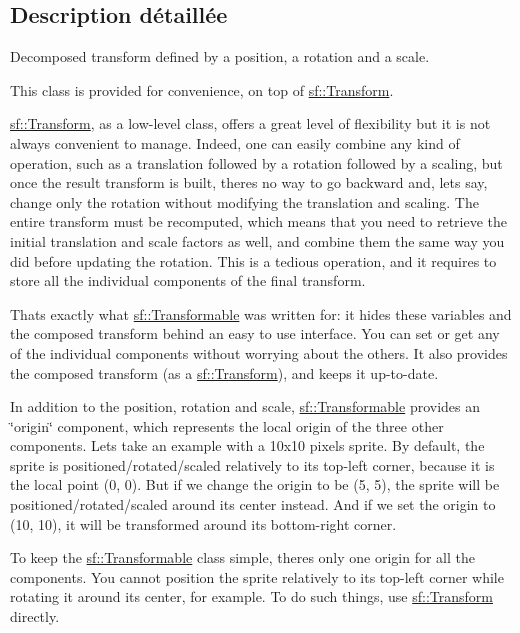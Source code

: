 \subsection{Description détaillée}
Decomposed transform defined by a position, a rotation and a scale. 

This class is provided for convenience, on top of \hyperlink{classsf_1_1Transform}{sf\+::\+Transform}.

\hyperlink{classsf_1_1Transform}{sf\+::\+Transform}, as a low-\/level class, offers a great level of flexibility but it is not always convenient to manage. Indeed, one can easily combine any kind of operation, such as a translation followed by a rotation followed by a scaling, but once the result transform is built, there\textquotesingle{}s no way to go backward and, let\textquotesingle{}s say, change only the rotation without modifying the translation and scaling. The entire transform must be recomputed, which means that you need to retrieve the initial translation and scale factors as well, and combine them the same way you did before updating the rotation. This is a tedious operation, and it requires to store all the individual components of the final transform.

That\textquotesingle{}s exactly what \hyperlink{classsf_1_1Transformable}{sf\+::\+Transformable} was written for\+: it hides these variables and the composed transform behind an easy to use interface. You can set or get any of the individual components without worrying about the others. It also provides the composed transform (as a \hyperlink{classsf_1_1Transform}{sf\+::\+Transform}), and keeps it up-\/to-\/date.

In addition to the position, rotation and scale, \hyperlink{classsf_1_1Transformable}{sf\+::\+Transformable} provides an \char`\"{}origin\char`\"{} component, which represents the local origin of the three other components. Let\textquotesingle{}s take an example with a 10x10 pixels sprite. By default, the sprite is positioned/rotated/scaled relatively to its top-\/left corner, because it is the local point (0, 0). But if we change the origin to be (5, 5), the sprite will be positioned/rotated/scaled around its center instead. And if we set the origin to (10, 10), it will be transformed around its bottom-\/right corner.

To keep the \hyperlink{classsf_1_1Transformable}{sf\+::\+Transformable} class simple, there\textquotesingle{}s only one origin for all the components. You cannot position the sprite relatively to its top-\/left corner while rotating it around its center, for example. To do such things, use \hyperlink{classsf_1_1Transform}{sf\+::\+Transform} directly.

